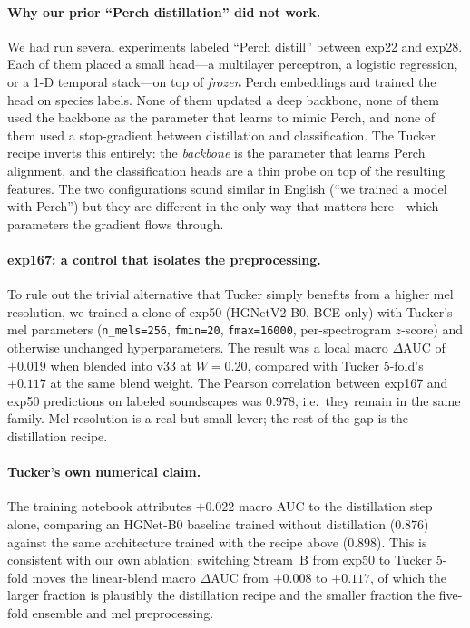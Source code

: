 \paragraph{Why our prior ``Perch distillation'' did not work.}
We had run several experiments labeled ``Perch distill'' between
exp22 and exp28. Each of them placed a small head---a multilayer
perceptron, a logistic regression, or a 1-D temporal stack---on
top of \emph{frozen} Perch embeddings and trained the head on
species labels. None of them updated a deep backbone, none of
them used the backbone as the parameter that learns to mimic
Perch, and none of them used a stop-gradient between distillation
and classification. The Tucker recipe inverts this entirely: the
\emph{backbone} is the parameter that learns Perch alignment, and
the classification heads are a thin probe on top of the resulting
features. The two configurations sound similar in English (``we
trained a model with Perch'') but they are different in the only
way that matters here---which parameters the gradient flows
through.

\paragraph{exp167: a control that isolates the preprocessing.}
To rule out the trivial alternative that Tucker simply benefits
from a higher mel resolution, we trained a clone of exp50
(HGNetV2-B0, BCE-only) with Tucker's mel parameters
(\texttt{n\_mels=256}, \texttt{fmin=20}, \texttt{fmax=16000},
per-spectrogram $z$-score) and otherwise unchanged hyperparameters.
The result was a local macro $\Delta$AUC of $+0.019$ when blended
into v33 at $W=0.20$, compared with Tucker 5-fold's $+0.117$ at
the same blend weight. The Pearson correlation between exp167 and
exp50 predictions on labeled soundscapes was $0.978$, i.e.\ they
remain in the same family. Mel resolution is a real but small
lever; the rest of the gap is the distillation recipe.

\paragraph{Tucker's own numerical claim.}
The training notebook attributes $+0.022$ macro AUC to the
distillation step alone, comparing an HGNet-B0 baseline trained
without distillation ($0.876$) against the same architecture
trained with the recipe above ($0.898$). This is consistent with
our own ablation: switching Stream~B from exp50 to Tucker 5-fold
moves the linear-blend macro $\Delta$AUC from $+0.008$ to
$+0.117$, of which the larger fraction is plausibly the
distillation recipe and the smaller fraction the five-fold
ensemble and mel preprocessing.


